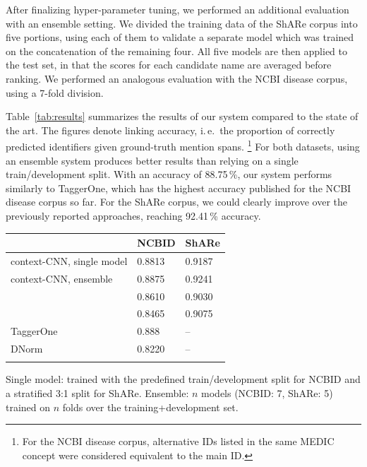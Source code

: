 \documentclass{bioinfo}
\newcommand{\ie}{i.\,e.\ }
\begin{document}
After finalizing hyper-parameter tuning, we performed an additional evaluation with an ensemble setting.
We divided the training data of the ShARe corpus into five portions, using each of them to validate a separate model which was trained on the concatenation of the remaining four.
All five models are then applied to the test set, in that the scores for each candidate name are averaged before ranking.
We performed an analogous evaluation with the NCBI disease corpus, using a 7-fold division.

Table~\ref{tab:results} summarizes the results of our system compared to the state of the art.
The figures denote linking accuracy, \ie the proportion of correctly predicted identifiers given ground-truth mention spans.%
\footnote{For the NCBI disease corpus, alternative IDs listed in the same MEDIC concept were considered equivalent to the main ID.}  %
For both datasets, using an ensemble system produces better results than relying on a single train/development split.
With an accuracy of 88.75\,\%, our system performs similarly to TaggerOne, which has the highest accuracy published for the NCBI disease corpus so far.
For the ShARe corpus, we could clearly improve over the previously reported approaches, reaching 92.41\,\% accuracy.

\begin{table}[!t]
{\begin{tabular}{@{}lll@{}}\toprule
                                   & NCBID  & ShARe \\\midrule
  context-CNN, single model        & 0.8813 & 0.9187 \\
  context-CNN, ensemble            & 0.8875 & 0.9241 \\
  \cite{lihaodi-et-al:2017}        & 0.8610 & 0.9030 \\
  \cite{dsouza-ng:2015:ACL-IJCNLP} & 0.8465 & 0.9075 \\
  TaggerOne                        & 0.888  & -- \\
  DNorm                            & 0.8220 & -- \\\botrule
\end{tabular}}{Single model: trained with the predefined train/development split for NCBID and a stratified 3:1 split for ShARe. Ensemble: $n$ models (NCBID: 7, ShARe: 5) trained on $n$ folds over the training+development set.}
\end{table}
\end{document}
